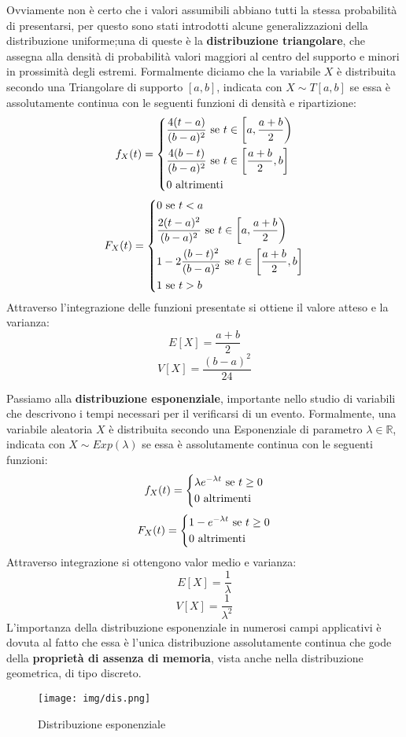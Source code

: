 \documentclass[a4paper,12pt, oneside]{book}
\newcommand{\numberset}{\mathbb}
\newcommand{\R}{\numberset{R}}
\begin{document}
Ovviamente non è certo che i valori assumibili abbiano tutti la stessa probabilità di presentarsi, per questo
sono stati introdotti alcune generalizzazioni della distribuzione uniforme;una di queste è la
\textbf{distribuzione triangolare}, che assegna alla densità di probabilità valori maggiori al centro del
supporto e minori in prossimità degli estremi.\newline
Formalmente diciamo che la variabile $X$ è distribuita secondo una Triangolare di supporto $[a,b]$, indicata
con $X \sim T[a, b]$ se essa è assolutamente continua con le seguenti funzioni di densità e ripartizione:
\[f_X(t) = \begin{dcases}
            \frac{4(t-a)}{(b-a)^2} \mbox{ se } t \in \left[a,\frac{a+b}{2}\right)\\
            \frac{4(b-t)}{(b-a)^2} \mbox{ se } t \in \left[\frac{a+b}{2},b\right]\\
            0                      \mbox{ altrimenti}
            \end{dcases}\]
\[F_X(t) = \begin{dcases}
            0 \mbox{ se } t<a\\
            \frac{2(t-a)^2}{(b-a)^2} \mbox{ se } t \in \left[a, \frac{a+b}{2}\right)\\
            1-2\frac{(b-t)^2}{(b-a)^2} \mbox{ se } t \in \left[\frac{a+b}{2}, b\right]\\
            1 \mbox{ se } t>b\\
            \end{dcases}\]
Attraverso l'integrazione delle funzioni presentate si ottiene il valore atteso e la varianza:
\[E[X] = \frac{a+b}{2}\]
\[V[X] = \frac{(b-a)^2}{24}\]

Passiamo alla \textbf{distribuzione esponenziale}, importante nello studio di variabili che descrivono i tempi
necessari per il verificarsi di un evento.\newline
Formalmente, una variabile aleatoria $X$ è distribuita secondo una Esponenziale di parametro $\lambda \in \R$,
indicata con $X \sim Exp(\lambda)$ se essa è assolutamente continua con le seguenti funzioni:
\[f_X(t) = \begin{dcases}
            \lambda e^{-\lambda t} \mbox{ se } t \geq 0\\
            0 \mbox{ altrimenti}
            \end{dcases}\]
\[F_X(t) = \begin{dcases}
            1 - e^{-\lambda t} \mbox{ se } t \geq 0\\
            0 \mbox{ altrimenti}
            \end{dcases}\]
Attraverso integrazione si ottengono valor medio e varianza:
\[E[X] = \frac{1}{\lambda}\]
\[V[X] = \frac{1}{\lambda^2}\]
L'importanza della distribuzione esponenziale in numerosi campi applicativi è dovuta al fatto che essa è
l’unica distribuzione assolutamente continua che gode della \textbf{proprietà di assenza di memoria}, vista
anche nella distribuzione geometrica, di tipo discreto.
\begin{figure}
    \caption{Distribuzione esponenziale}
	\texttt{[image: img/dis.png]}
\end{figure}
\end{document}
